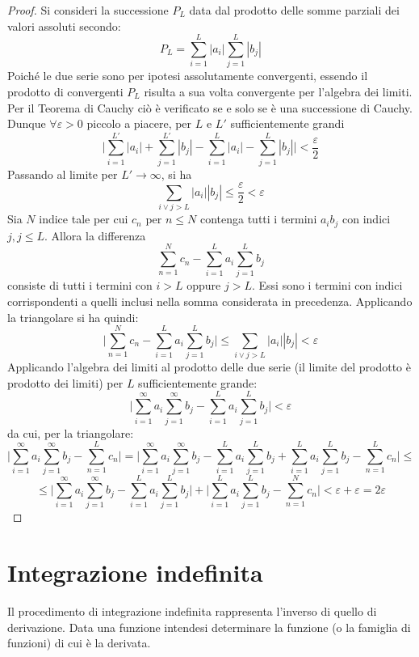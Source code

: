 \documentclass[10pt]{article}
\theoremstyle{plain}
\begin{document}
\begin{proof}
    Si consideri la successione $P_L$ data dal prodotto delle somme parziali dei valori assoluti secondo:
    \[P_L = \sum \limits_{i=1}^L |a_i| \sum \limits_{j=1}^L |b_j|\]
    Poiché le due serie sono per ipotesi assolutamente convergenti, essendo il prodotto di convergenti $P_L$ risulta a sua volta convergente per l'algebra dei limiti. Per il Teorema di Cauchy ciò è verificato se e solo se è una successione di Cauchy. Dunque $\forall \varepsilon > 0$ piccolo a piacere, per $L$ e $L'$ sufficientemente grandi
    \[\big|\sum \limits_{i=1}^{L'} |a_i| + \sum \limits_{j=1}^{L'} |b_j| - \sum \limits_{i=1}^{L} |a_i| - \sum \limits_{j=1}^{L} |b_j|\big| < \frac{\varepsilon}{2}\]
    Passando al limite per $L' \rightarrow \infty$, si ha 
    \[\sum_{i \lor j > L} |a_i||b_j| \leq \frac{\varepsilon}{2} < \varepsilon\]
    Sia $N$ indice tale per cui $c_n$ per $n \leq N$ contenga tutti i termini $a_i b_j$ con indici $j, j \leq L$. Allora la differenza
    \[\sum \limits_{n=1}^{N} c_n - \sum \limits_{i=1}^{L} a_i \sum \limits_{j=1}^{L} b_j\]
    consiste di tutti i termini con $i > L$ oppure $j > L$. Essi sono i termini con indici corrispondenti a quelli inclusi nella somma considerata in precedenza. Applicando la triangolare si ha quindi:
    \[\bigg|\sum \limits_{n=1}^{N} c_n - \sum \limits_{i=1}^{L} a_i \sum \limits_{j=1}^{L} b_j \bigg| \leq \sum_{i \lor j > L} |a_i||b_j| < \varepsilon\]
    Applicando l'algebra dei limiti al prodotto delle due serie (il limite del prodotto è prodotto dei limiti) per $L$ sufficientemente grande:
    \[\bigg| \sum \limits_{i=1}^{\infty} a_i \sum \limits_{j=1}^{\infty} b_j - \sum \limits_{i=1}^{L} a_i \sum \limits_{j=1}^{L} b_j\bigg| < \varepsilon\]
    da cui, per la triangolare: 
    \[\bigg|\sum \limits_{i=1}^{\infty} a_i \sum \limits_{j=1}^{\infty} b_j - \sum \limits_{n=1}^{L} c_n \bigg| = \bigg|\sum \limits_{i=1}^{\infty} a_i \sum \limits_{j=1}^{\infty} b_j - \sum \limits_{i=1}^{L} a_i \sum \limits_{j=1}^{L} b_j + \sum \limits_{i=1}^{L} a_i \sum \limits_{j=1}^{L} b_j - \sum \limits_{n=1}^{L} c_n \bigg| \leq\]
    \[\leq \bigg| \sum \limits_{i=1}^{\infty} a_i \sum \limits_{j=1}^{\infty} b_j - \sum \limits_{i=1}^{L} a_i \sum \limits_{j=1}^{L} b_j\bigg| + \bigg|\sum \limits_{i=1}^{L} a_i \sum \limits_{j=1}^{L} b_j - \sum \limits_{n=1}^{N} c_n\bigg| < \varepsilon + \varepsilon = 2 \varepsilon\]
\end{proof}

\section{Integrazione indefinita}
Il procedimento di integrazione indefinita rappresenta l'inverso di quello di derivazione. Data una funzione intendesi determinare la funzione (o la famiglia di funzioni) di cui è la derivata.
\end{document}
